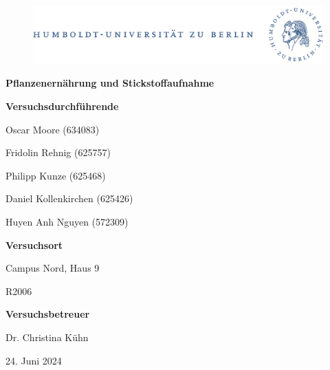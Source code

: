 \documentclass[10pt,a4paper]{article}
\begin{document}
	
	\begin{titlepage}
		\begin{center}
			\begin{figure}[h!tbp]
				\includegraphics[width=\linewidth]{HUlogo.PNG}
			\end{figure}
			\vspace*{2 cm}
			
			\textcolor{Bluetitle}{\textbf{\huge Pflanzenernährung und Stickstoffaufnahme}}\par
			
			\vspace*{2cm}
			
			\textcolor{Greyish}{\textbf{Versuchsdurchführende}}\par
			\textcolor{Greyish}{Oscar Moore (634083)}\par
			\textcolor{Greyish}{Fridolin Rehnig (625757)}\par
			\textcolor{Greyish}{Philipp Kunze (625468)}\par
			\textcolor{Greyish}{Daniel Kollenkirchen (625426)}\par
			\textcolor{Greyish}{Huyen Anh Nguyen (572309)}\par
			
			\vspace*{0.5cm}
			\textcolor{Greyish}{\textbf{Versuchsort}}\par
			\textcolor{Greyish}{Campus Nord, Haus 9}\par
			\textcolor{Greyish}{R2006}\par
			\vspace*{0.5cm}
			\textcolor{Greyish}{\textbf{Versuchsbetreuer}}\par
			\textcolor{Greyish}{Dr. Christina Kühn}\par
			
			\vspace*{2 cm}
			
			\textcolor{Greyish}{24. Juni 2024}\par
			
			
			
			
		\end{center}
	\end{titlepage}
	
\end{document}
